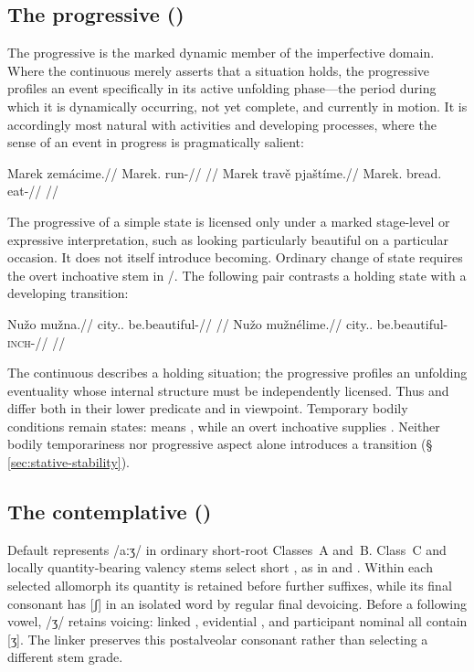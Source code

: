 \subsection{The progressive ()}
The progressive is the marked dynamic member of the imperfective domain.
Where the continuous merely asserts that a situation holds, the progressive
profiles an event specifically in its active unfolding phase---the period during
which it is dynamically occurring, not yet complete, and currently in motion.
It is accordingly most natural with activities and developing processes, where
the sense of an event in progress is pragmatically salient:

\pex
\a
\begingl
\gla Marek zemácime.//
\glb Marek.\Dir{} run-\Prog{}//
\glft {} //
\endgl
\a
\begingl
\gla Marek travě pjaštíme.//
\glb Marek.\Dir{} bread.\Ind{} eat-\Prog{}//
\glft {} //
\endgl
\xe

The progressive of a simple state is licensed only under a marked
stage-level or expressive interpretation, such as looking particularly beautiful
on a particular occasion. It does not itself introduce becoming. Ordinary
change of state requires the overt inchoative stem in /.
The following pair contrasts a holding state with a developing transition:

\pex
\a
\begingl
\gla Nužo mužna.//
\glb city.\Dir{}.\Def{} be.beautiful-\Cont{}//
\glft {} //
\endgl
\a
\begingl
\gla Nužo mužnélime.//
\glb city.\Dir{}.\Def{} be.beautiful-\textsc{inch}-\Prog{}//
\glft {} //
\endgl
\xe

The continuous describes a holding situation; the progressive profiles an
unfolding eventuality whose internal structure must be independently licensed.
Thus  and  differ both in their
lower predicate and in viewpoint. Temporary bodily conditions remain states:
 means , while an overt inchoative supplies
. Neither bodily temporariness nor progressive aspect
alone introduces a transition (§\,\ref{sec:stative-stability}).


\subsection{The contemplative ()}
Default  represents /aːʒ/ in ordinary short-root
Classes~A and~B. Class~C and locally quantity-bearing valency stems
select short , as in  and .
Within each selected allomorph its quantity is retained before further
suffixes, while its final consonant has [ʃ] in an isolated
word by regular final devoicing. Before a following vowel, /ʒ/ retains
voicing: linked , evidential , and
participant nominal  all contain [ʒ]. The linker
preserves this postalveolar consonant rather than selecting a different
stem grade.

